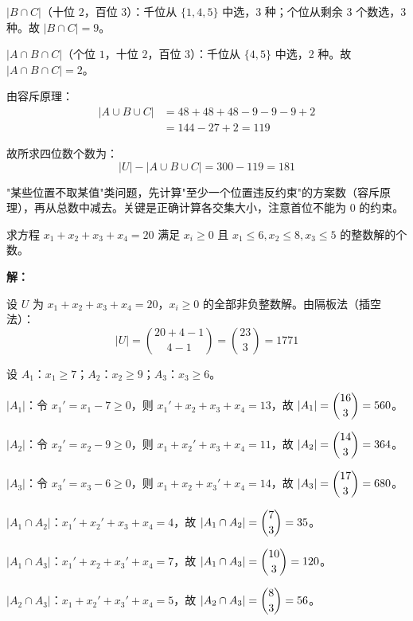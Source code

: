 \documentclass[12pt, a4paper]{ctexart}
\begin{document}
\(|B\cap C|\)（十位 \(2\)，百位 \(3\)）：千位从 \(\{1,4,5\}\) 中选，3 种；个位从剩余 3 个数选，3 种。故 \(|B\cap C|=9\)。

\(|A\cap B\cap C|\)（个位 \(1\)，十位 \(2\)，百位 \(3\)）：千位从 \(\{4,5\}\) 中选，2 种。故 \(|A\cap B\cap C|=2\)。

由容斥原理：
\begin{align*}
|A\cup B\cup C| &= 48+48+48 - 9-9-9 + 2 \\
&= 144 - 27 + 2 = 119
\end{align*}

故所求四位数个数为：
\[
|U| - |A\cup B\cup C| = 300 - 119 = \boxed{181}
\]

\begin{tipbox}[方法总结]
"某些位置不取某值"类问题，先计算"至少一个位置违反约束"的方案数（容斥原理），再从总数中减去。关键是正确计算各交集大小，注意首位不能为 \(0\) 的约束。
\end{tipbox}

\vspace{6pt}

\begin{examplebox}
求方程 \(x_1 + x_2 + x_3 + x_4 = 20\) 满足 \(x_i \ge 0\) 且 \(x_1 \le 6, x_2 \le 8, x_3 \le 5\) 的整数解的个数。
\end{examplebox}

\textbf{解：}

设 \(U\) 为 \(x_1+x_2+x_3+x_4=20\)，\(x_i\ge 0\) 的全部非负整数解。由隔板法（插空法）：
\[
|U| = \binom{20+4-1}{4-1} = \binom{23}{3} = 1771
\]

设 \(A_1\)：\(x_1 \ge 7\)；\(A_2\)：\(x_2 \ge 9\)；\(A_3\)：\(x_3 \ge 6\)。

\(|A_1|\)：令 \(x_1' = x_1 - 7 \ge 0\)，则 \(x_1'+x_2+x_3+x_4 = 13\)，故 \(|A_1| = \dbinom{16}{3} = 560\)。

\(|A_2|\)：令 \(x_2' = x_2 - 9 \ge 0\)，则 \(x_1+x_2'+x_3+x_4 = 11\)，故 \(|A_2| = \dbinom{14}{3} = 364\)。

\(|A_3|\)：令 \(x_3' = x_3 - 6 \ge 0\)，则 \(x_1+x_2+x_3'+x_4 = 14\)，故 \(|A_3| = \dbinom{17}{3} = 680\)。

\(|A_1\cap A_2|\)：\(x_1'+x_2'+x_3+x_4 = 4\)，故 \(|A_1\cap A_2| = \dbinom{7}{3} = 35\)。

\(|A_1\cap A_3|\)：\(x_1'+x_2+x_3'+x_4 = 7\)，故 \(|A_1\cap A_3| = \dbinom{10}{3} = 120\)。

\(|A_2\cap A_3|\)：\(x_1+x_2'+x_3'+x_4 = 5\)，故 \(|A_2\cap A_3| = \dbinom{8}{3} = 56\)。
\end{document}
